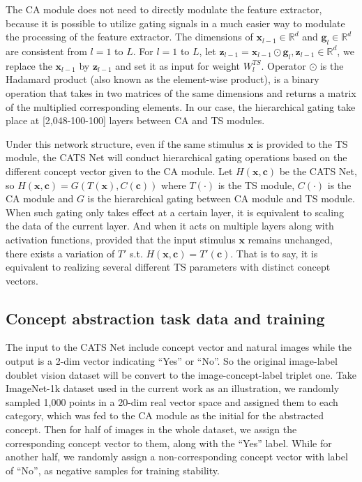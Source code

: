 \documentclass[pdflatex,sn-mathphys-num,lineno]{sn-jnl}%
\begin{document}
\begin{CJK}{UTF8}{gbsn}
The CA module does not need to directly modulate the feature extractor, because it is possible to utilize gating signals in a much easier way to modulate the processing of the feature extractor. The dimensions of $\mathbf{x}_{l-1} \in \mathbb{R}^{d}$ and $\mathbf{g}_{l} \in \mathbb{R}^{d}$ are consistent from $l=1$ to $L$. For $l=1$ to $L$, let $\mathbf{z}_{l-1} = \mathbf{x}_{l-1} \odot \mathbf{g}_{l}, \mathbf{z}_{l-1} \in \mathbb{R}^{d}$, we replace the $\mathbf{x}_{l-1}$ by $\mathbf{z}_{l-1}$ and set it as input for weight $W_{l}^{TS}$. Operator $\odot$ is the Hadamard product (also known as the element-wise product), is a binary operation that takes in two matrices of the same dimensions and returns a matrix of the multiplied corresponding elements. In our case, the hierarchical gating take place at [2,048-100-100] layers between CA and TS modules.

Under this network structure, even if the same stimulus $\mathbf{x}$ is provided to the TS module, the CATS Net will conduct hierarchical gating operations based on the different concept vector given to the CA module. Let $H(\mathbf{x}, \mathbf{c})$ be the CATS Net, so $H(\mathbf{x}, \mathbf{c}) = G(T(\mathbf{x}), C(\mathbf{c}))$ where $T(\cdot)$ is the TS module, $C(\cdot)$ is the CA module and $G$ is the hierarchical gating between CA module and TS module. When such gating only takes effect at a certain layer, it is equivalent to scaling the data of the current layer. And when it acts on multiple layers along with activation functions, provided that the input stimulus $\mathbf{x}$ remains unchanged, there exists a variation of $T'$ s.t. $H(\mathbf{x}, \mathbf{c}) = T'(\mathbf{c})$. That is to say, it is equivalent to realizing several different TS parameters with distinct concept vectors.

\subsection{Concept abstraction task data and training}

The input to the CATS Net include concept vector and natural images while the output is a 2-dim vector indicating “Yes” or “No”. So the original image-label doublet vision dataset will be convert to the image-concept-label triplet one. Take ImageNet-1k dataset used in the current work as an illustration, we randomly sampled 1,000 points in a 20-dim real vector space and assigned them to each category, which was fed to the CA module as the initial for the abstracted concept. Then for half of images in the whole dataset, we assign the corresponding concept vector to them, along with the “Yes” label. While for another half, we randomly assign a non-corresponding concept vector with label of “No”, as negative samples for training stability. 


\end{CJK}
\end{document}
